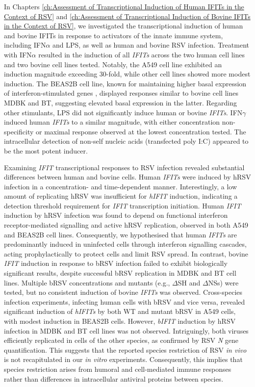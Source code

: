 In Chapters \ref{ch:Assessment of Transcriptional Induction of Human IFITs in the Context of RSV} and \ref{ch:Assessment of Transcriptional Induction of Bovine IFITs in the Context of RSV}, we investigated the transcriptional induction of human and bovine IFITs in response to activators of the innate immune system, including IFN\(\alpha\) and LPS, as well as human and bovine RSV infection. Treatment with IFN\(\alpha\) resulted in the induction of all \textit{IFITs} across the two human cell lines and two bovine cell lines tested. Notably, the A549 cell line exhibited an induction magnitude exceeding 30-fold, while other cell lines showed more modest induction. The BEAS2B cell line, known for maintaining higher basal expression of interferon-stimulated genes \cite{Seng2014HighResistance}, displayed responses similar to bovine cell lines MDBK and BT, suggesting elevated basal expression in the latter. Regarding other stimulants, LPS did not significantly induce human or bovine \textit{IFITs}. IFN\(\gamma\) induced human \textit{IFITs} to a similar magnitude, with either concentration non-specificity or maximal response observed at the lowest concentration tested. The intracellular detection of non-self nucleic acids (transfected poly I:C) appeared to be the most potent inducer.

Examining \textit{IFIT} transcriptional responses to RSV infection revealed substantial differences between human and bovine cells. Human \textit{IFITs} were induced by hRSV infection in a concentration- and time-dependent manner. Interestingly, a low amount of replicating hRSV was insufficient for \textit{hIFIT} induction, indicating a detection threshold requirement for \textit{IFIT} transcription initiation. Human \textit{IFIT} induction by hRSV infection was found to depend on functional interferon receptor-mediated signalling and active hRSV replication, observed in both A549 and BEAS2B cell lines. Consequently, we hypothesised that human \textit{IFITs} are predominantly induced in uninfected cells through interferon signalling cascades, acting prophylactically to protect cells and limit RSV spread. In contrast, bovine \textit{IFIT} induction in response to bRSV infection failed to exhibit biologically significant results, despite successful bRSV replication in MDBK and BT cell lines. Multiple bRSV concentrations and mutants (e.g., $\Delta$SH and $\Delta$NSs) were tested, but no consistent induction of bovine \textit{IFITs} was observed. Cross-species infection experiments, infecting human cells with bRSV and vice versa, revealed significant induction of \textit{hIFITs} by both WT and mutant bRSV in A549 cells, with modest induction in BEAS2B cells. However, \textit{bIFIT} induction by hRSV infection in MDBK and BT cell lines was not observed. Intriguingly, both viruses efficiently replicated in cells of the other species, as confirmed by RSV \textit{N} gene quantification. This suggests that the reported species restriction of RSV \textit{in vivo} is not recapitulated in our \textit{in vitro} experiments. Consequently, this implies that species restriction arises from humoral and cell-mediated immune responses rather than differences in intracellular antiviral proteins between species.

